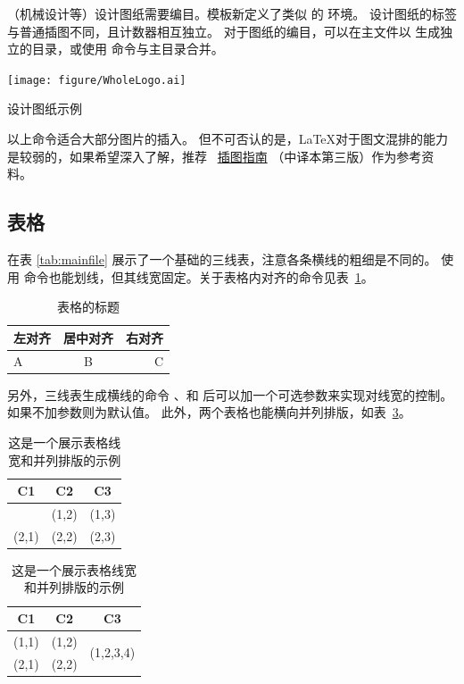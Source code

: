 （机械设计等）设计图纸需要编目。模板新定义了类似  的 环境。
设计图纸的标签与普通插图不同，且计数器相互独立。
对于图纸的编目，可以在主文件以  生成独立的目录，或使用
命令与主目录合并。
\begin{dfigure}%
	\centering
	\texttt{[image: figure/WholeLogo.ai]}
	\caption{设计图纸示例}%
\end{dfigure}

以上命令适合大部分图片的插入。
但不可否认的是，\LaTeX{}对于图文混排的能力是较弱的，如果希望深入了解，推荐~
\href{https://github.com/WenboSheng/epslatex-cn}{\LaTeXe 插图指南}
（中译本第三版）作为参考资料。


\subsection{表格}\label{subsec:tab}
在表 \ref{tab:mainfile} 展示了一个基础的三线表，注意各条横线的粗细是不同的。
使用 命令也能划线，但其线宽固定。关于表格内对齐的命令见表~\ref{tab:lcr}。
\begin{table}[H]
	\centering
	\caption{表格的标题}\label{tab:lcr}
	\begin{tabular}{lcr}
		\hline
		左对齐 & 居中对齐 & 右对齐 \\
		\hline
		A      & B        & C      \\
		\hline
	\end{tabular}
\end{table}

另外，三线表生成横线的命令 、和
后可以加一个可选参数来实现对线宽的控制。
如果不加参数则为默认值。
此外，两个表格也能横向并列排版，如表~\ref{tab:2tab}。

\begin{table}[H]
	\centering
	\caption{这是一个展示表格线宽和并列排版的示例}
	\label{tab:2tab}
	\begin{tabular}{ccc}
		\toprule[1.5pt]
		C1    & C2    & C3    \\\midrule[1pt]
		(1,1) & (1,2) & (1,3) \\
		(2,1) & (2,2) & (2,3) \\\midrule[1pt]
	\end{tabular}
	\hspace{1cm}
	\begin{tabular}{ccc}
		\midrule
		C1    & C2    & C3                         \\\toprule
		(1,1) & (1,2) & \multirow{2}{*}{(1,2,3,4)} \\
		(2,1) & (2,2) &                            \\\bottomrule
	\end{tabular}
\end{table}


